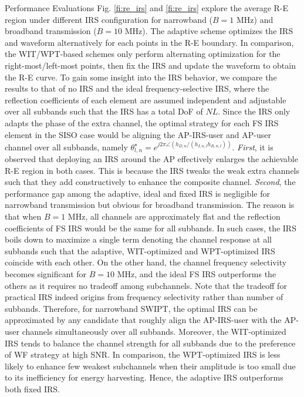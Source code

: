 \documentclass[journal]{IEEEtran}
\begin{document}
\begin{section}{Performance Evaluations}
	Fig. \ref{fi:re_irs} and \ref{fi:re_irs} explore the average R-E region under different IRS configuration for narrowband ($B=1$ \si{\MHz}) and broadband transmission ($B=10$ \si{\MHz}). The adaptive scheme optimizes the IRS and waveform alternatively for each points in the R-E boundary. In comparison, the WIT/WPT-based schemes only perform alternating optimization for the right-most/left-most points, then fix the IRS and update the waveform to obtain the R-E curve. To gain some insight into the IRS behavior, we compare the results to that of no IRS and the ideal frequency-selective IRS, where the reflection coefficients of each element are assumed independent and adjustable over all subbands such that the IRS has a total DoF of $NL$. Since the IRS only adapts the phase of the extra channel, the optimal strategy for each FS IRS element in the SISO case would be aligning the AP-IRS-user and AP-user channel over all subbands, namely $\theta_{l,n}^{\star}=e^{j2\pi\angle{(h_{D,n}/(h_{I,n,l}h_{R,n,l}))}}$. \textit{First}, it is observed that deploying an IRS around the AP effectively enlarges the achievable R-E region in both cases. This is because the IRS tweaks the weak extra channels such that they add constructively to enhance the composite channel. \textit{Second}, the performance gap among the adaptive, ideal and fixed IRS is negligible for narrowband transmission but obvious for broadband transmission. The reason is that when $B=1$ \si{\MHz}, all channels are approximately flat and the reflection coefficients of FS IRS would be the same for all subbands. In such cases, the IRS boils down to maximize a single term denoting the channel response at all subbands such that the adaptive, WIT-optimized and WPT-optimized IRS coincide with each other. On the other hand, the channel frequency selectivity becomes significant for $B=10$ \si{\MHz}, and the ideal FS IRS outperforms the others as it requires no tradeoff among subchannels. Note that the tradeoff for practical IRS indeed origins from frequency selectivity rather than number of subbands. Therefore, for narrowband SWIPT, the optimal IRS can be approximated by any candidate that roughly align the AP-IRS-user with the AP-user channels simultaneously over all subbands. Moreover, the WIT-optimized IRS tends to balance the channel strength for all subbands due to the preference of WF strategy at high SNR. In comparison, the WPT-optimized IRS is less likely to enhance few weakest subchannels when their amplitude is too small due to its inefficiency for energy harvesting. Hence, the adaptive IRS outperforms both fixed IRS.
\end{section}



\end{document}
